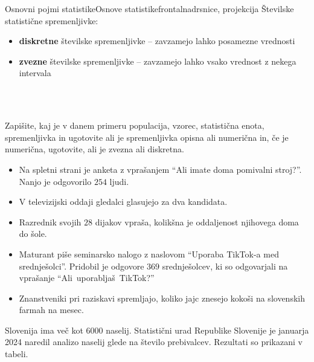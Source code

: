 \begin{priprava}{1}{}{Osnovni pojmi statistike}{Osnove statistike}{frontalna}{drsnice, projekcija}
                Številske statistične spremenljivke:
                \begin{itemize}
                    \item \textbf{diskretne} številske spremenljivke -- zavzamejo lahko posamezne vrednosti
                    \item \textbf{zvezne} številske spremenljivke -- zavzamejo lahko vsako vrednost z nekega intervala
                \end{itemize}

            


                ~\\~\\



        
            \begin{naloga}
                Zapišite, kaj je v danem primeru populacija, vzorec, statistična enota, spremenljivka in 
                ugotovite ali je spremenljivka opisna ali numerična in, če je numerična, ugotovite, ali je zvezna ali diskretna.
                \begin{itemize}
                        \item Na spletni strani je anketa z vprašanjem ``Ali imate doma pomivalni stroj?''. Nanjo je odgovorilo $254$ ljudi. 
                        \item V televizijski oddaji gledalci glasujejo za dva kandidata. 
                        \item Razrednik svojih $28$ dijakov vpraša, kolikšna je oddaljenost njihovega doma do šole.
                        \item Maturant piše seminarsko nalogo z naslovom ``Uporaba TikTok-a med srednješolci''. Pridobil je odgovore $369$ srednješolcev, ki so odgovarjali na vprašanje ``Ali~uporabljaš~TikTok?'' 
                        \item Znanstveniki pri raziskavi spremljajo, koliko jajc znesejo kokoši na slovenskih farmah na mesec.
                \end{itemize}
            \end{naloga}
        

        



            \begin{naloga}
                    Slovenija ima več kot $6000$ naselij. Statistični urad Republike Slovenije je januarja 2024 naredil analizo naselij glede na število prebivalcev. 
                    Rezultati so prikazani v tabeli. 


\end{naloga}
\end{priprava}
